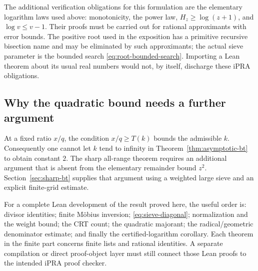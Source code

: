 The additional verification obligations for this formulation are the
elementary logarithm laws used above: monotonicity, the power law,
$H_z\geq\log(z+1)$, and $\log v\leq v-1$.  Their proofs must be
carried out for rational approximants with error bounds.  The positive
root used in the exposition has a primitive recursive bisection name
and may be eliminated by such approximants; the actual sieve parameter
is the bounded search \eqref{eq:root-bounded-search}.  Importing a Lean
theorem about its usual real numbers would not, by itself, discharge
these iPRA obligations.

\subsection{Why the quadratic bound needs a further argument}

At a fixed ratio $x/q$, the condition $x/q\geq T(k)$ bounds the
admissible $k$.  Consequently one cannot let $k$ tend to infinity in
Theorem~\ref{thm:asymptotic-bt} to obtain constant $2$.  The sharp
all-range theorem requires an additional argument that is absent from
the elementary remainder bound $z^2$.  Section~\ref{sec:sharp-bt}
supplies that argument using a weighted large sieve and an explicit
finite-grid estimate.

For a complete Lean development of the result proved here, the useful
order is: divisor identities; finite M\"obius inversion;
\eqref{eq:sieve-diagonal}; normalization and the weight bound;
the CRT count; the quadratic majorant; the radical/geometric
denominator estimate; and finally the certified-logarithm corollary.
Each theorem in the finite part concerns finite lists and rational
identities.  A separate compilation or direct proof-object layer must
still connect those Lean proofs to the intended iPRA proof checker.
